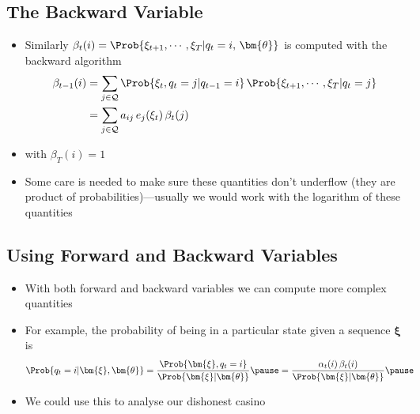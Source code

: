 \begin{slide}
\section{The Backward Variable}

\begin{PauseHighLight}
  \begin{itemize}
  \item Similarly $\beta_t(i) = \Prob{\xi_{t+1},\cdots,\xi_T | q_t =
      i,\,\bm{\theta}}$ is computed with the backward algorithm
    \begin{align*}
      \beta_{t-1}(i) &= \sum_{j\in\mathcal{Q}} 
                       \Prob{\xi_t, q_t=j | q_{t-1}=i} 
                       \, \Prob{\xi_{t+1},\cdots,\xi_T| q_t=j} \\
      &= \sum_{j\in\mathcal{Q}} a_{ij}\,e_j(\xi_t)\, \beta_{t}(j)
    \end{align*}
  \item with $\beta_{T}(i) = 1$\pause
  \item Some care is needed to make sure these quantities don't underflow
    (they are product of probabilities)---usually we would work with the
    logarithm of these quantities\pause
  \end{itemize}
\end{PauseHighLight}

\end{slide}


\begin{slide}
\section{Using Forward and Backward Variables}

\begin{PauseHighLight}
  \begin{itemize}
  \item With both forward and backward variables we can compute more
    complex quantities\pause
  \item For example, the probability of being in a particular state
    given a sequence $\bm{\xi}$ is
    \begin{align*}
      \Prob{q_t = i | \bm{\xi}, \bm{\theta}}
      &=  \frac{\Prob{\bm{\xi},q_t =i}}  {\Prob{\bm{\xi}|\bm{\theta}}}\pause
        = \frac{\alpha_t(i)\, \beta_t(i)}{\Prob{\bm{\xi}|\bm{\theta}}}\pause
    \end{align*}
  \item We could use this to analyse our dishonest casino\pause
  \end{itemize}
\end{PauseHighLight}

\end{slide}

